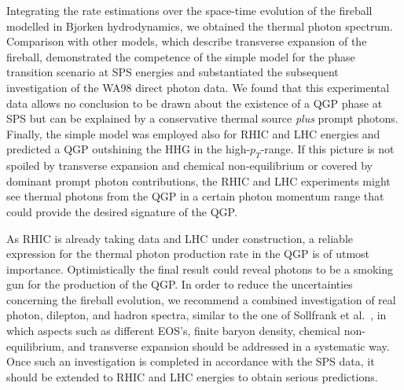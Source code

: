 \documentclass[12pt,twoside,fleqn]{article}
\begin{document}
Integrating the rate estimations over the space-time evolution of the fireball
modelled in Bjorken hydrodynamics, we obtained the thermal photon spectrum.
Comparison with other models, which describe transverse expansion of the
fireball, demonstrated the competence of the simple model for the phase
transition scenario at SPS energies and substantiated the subsequent
investigation of the WA98 direct photon data.  We found that this experimental
data allows no conclusion to be drawn about the existence of a QGP phase at SPS
but can be explained by a conservative thermal source {\em plus} prompt photons.
Finally, the simple model was employed also for RHIC and LHC energies and
predicted a QGP outshining the HHG in the high-$p_T$-range. If this picture is
not spoiled by transverse expansion and chemical non-equilibrium or covered by
dominant prompt photon contributions, the RHIC and LHC experiments might see
thermal photons from the QGP in a certain photon momentum range that could
provide the desired signature of the QGP.

As RHIC is already taking data and LHC under construction, a reliable expression
for the thermal photon production rate in the QGP is of utmost importance.
Optimistically the final result could reveal photons to be a smoking gun for the
production of the QGP. In order to reduce the uncertainties concerning the
fireball evolution, we recommend a combined investigation of real photon,
dilepton, and hadron spectra, similar to the one of Sollfrank et
al.~\cite{SOLLFRANK_1997}, in which aspects such as different EOS's, finite
baryon density, chemical non-equilibrium, and transverse expansion should be
addressed in a systematic way. Once such an investigation is completed in
accordance with the SPS data, it should be extended to RHIC and LHC energies to
obtain serious predictions.
%
\end{document}

